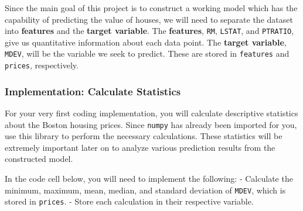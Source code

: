 \documentclass{article}
\begin{document}
Since the main goal of this project is to construct a working model
which has the capability of predicting the value of houses, we will need
to separate the dataset into \textbf{features} and the \textbf{target
variable}. The \textbf{features},
\texttt{\textquotesingle{}RM\textquotesingle{}},
\texttt{\textquotesingle{}LSTAT\textquotesingle{}}, and
\texttt{\textquotesingle{}PTRATIO\textquotesingle{}}, give us
quantitative information about each data point. The \textbf{target
variable}, \texttt{\textquotesingle{}MDEV\textquotesingle{}}, will be
the variable we seek to predict. These are stored in \texttt{features}
and \texttt{prices}, respectively.

    \subsubsection{Implementation: Calculate
Statistics}\label{implementation-calculate-statistics}

For your very first coding implementation, you will calculate
descriptive statistics about the Boston housing prices. Since
\texttt{numpy} has already been imported for you, use this library to
perform the necessary calculations. These statistics will be extremely
important later on to analyze various prediction results from the
constructed model.

In the code cell below, you will need to implement the following: -
Calculate the minimum, maximum, mean, median, and standard deviation of
\texttt{\textquotesingle{}MDEV\textquotesingle{}}, which is stored in
\texttt{prices}. - Store each calculation in their respective variable.
\end{document}
